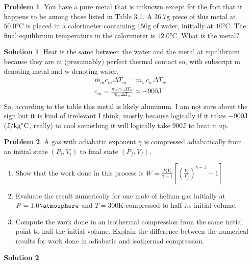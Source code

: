 \documentclass[10pt]{article}
\theoremstyle{definition}
\newtheorem{problem}{Problem}
\newtheorem{soln}{Solution}
\begin{document}
\begin{problem}
You have a pure metal that is unknown except for the fact that it happens to be among those listed in Table 3.1. A $36.7\unit{\gram}$ piece of this metal
at $50.0\unit{\celsius}$ is placed in a calorimeter containing $150\unit{\gram}$ of water, initially at $10\unit{\celsius}$. The final equilibrium temperature in the calorimeter is $12.0\unit{\celsius}$.
What is the metal?
\end{problem}
\begin{soln}
  Heat is the same between the water and the metal at equilibrium because they are in (presumably) perfect thermal contact so, with subscript m denoting metal and w denoting water,
  \begin{align*}
     & m_mc_m\Delta T_m=m_wc_w\Delta T_w                            \\
     & c_m=\frac{m_wc_w\Delta T_w}{m_m\Delta T_m}\approx-900\unit{\joule} \\
  \end{align*}
  So, according to the table this metal is likely aluminum. I am not sure about the sign but it is kind of irrelevant I think, mostly because logically if it takes $-900\unit{\joule}$ ($\unit{\joule\per{\kilogram\celsius}}$, really) to cool
  something it will logically take $900\unit{\joule}$ to heat it up.
\end{soln}

\begin{problem}
A gas with adiabatic exponent $\gamma$ is compressed adiabatically from an initial state $(P_i, V_i)$ to final state $(P_f, V_f)$.
\begin{enumerate}[label=(\alph*)]
  \item Show that the work done in this process is $W=\displaystyle\frac{P_iV_i}{\gamma-1}\left[\left(\frac{V_i}{V_f}\right)^{\gamma-1}-1\right]$
  \item Evaluate the result numerically for one mole of helium gas initially at $P=1.0\unit{\atmosphere}$ and $T=300\unit{\kelvin}$ compressed to half its initial volume.
  \item Compute the work done in an isothermal compression from the same initial point to half the initial volume.
        Explain the difference between the numerical results for work done in adiabatic and isothermal compression.
\end{enumerate}
\end{problem}
\begin{soln}
\end{soln}
\end{document}
